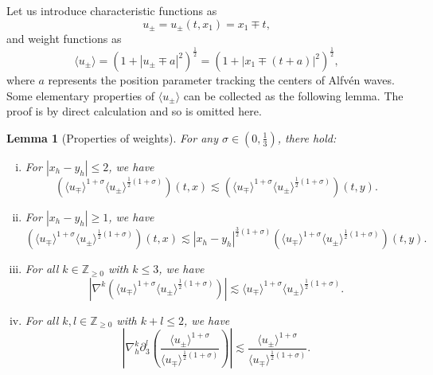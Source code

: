 \documentclass[10pt,reqno]{amsart}
\numberwithin{equation}{section}
\newtheorem{lemma}[theorem]{Lemma}
\begin{document}
Let us introduce characteristic functions as  
\begin{equation}\label{def:u}
u_\pm=u_\pm(t,x_1)=x_1\mp t,
\end{equation}
and  weight functions as 
\begin{equation}\label{def:weight}
\langle u_\pm\rangle=(1+|u_\pm\mp a|^2)^{\frac{1}{2}}=(1+|x_1\mp(t+a)|^2)^{\frac{1}{2}},
\end{equation}
where $a$ represents the position parameter tracking the centers of Alfv\'en waves. Some elementary properties of $\langle u_\pm\rangle$ can be collected as the following lemma. The proof is by direct calculation and so is omitted here. 
 
\begin{lemma}[Properties of weights]\label{lemma:weights}
For any  
 $\sigma\in (0,\frac{1}{3})$, there  hold:
\begin{enumerate}[(i)]
\item For $|x_h-y_h|\leqslant 2$, we have 
\begin{equation}\label{eq:weight1}
	\left(\langle u_\mp\rangle^{1+\sigma}\langle u_\pm\rangle^{\frac{1}{2}(1+\sigma)}\right)(t,x)\lesssim\left(\langle u_\mp\rangle^{1+\sigma}\langle u_\pm\rangle^{\frac{1}{2}(1+\sigma)}\right)(t,y).
\end{equation}
\item For $|x_h-y_h|\geqslant 1$, we have
\begin{equation}\label{eq:weight2}
\left(\langle u_\mp\rangle^{1+\sigma}\langle u_\pm\rangle^{\frac{1}{2}(1+\sigma)}\right)(t,x)\lesssim |x_h-y_h|^{\frac{3}{2}(1+\sigma)}\left(\langle u_\mp\rangle^{1+\sigma}\langle u_\pm\rangle^{\frac{1}{2}(1+\sigma)}\right)(t,y).
\end{equation}
\item For all $k\in\mathbb{Z}_{\geqslant 0}$ with $k\leqslant 3$, we have 
\begin{equation}\label{eq:weight3}
\left|\nabla^k\left(\langle u_\mp\rangle^{1+\sigma}\langle u_\pm\rangle^{\frac{1}{2}(1+\sigma)}\right)\right|\lesssim\langle u_\mp\rangle^{1+\sigma}\langle u_\pm\rangle^{\frac{1}{2}(1+\sigma)}.
\end{equation}
\item For all $k,l\in\mathbb{Z}_{\geqslant 0}$ with $k+l\leqslant 2$, we have 
\begin{equation}\label{eq:weightde}
\left|\nabla_h^k\partial_3^l\left(\frac{\langle u_\pm\rangle^{1+\sigma}}{\langle u_\mp\rangle^{\frac{1}{2}(1+\sigma)}}\right)\right|\lesssim\frac{\langle u_\pm\rangle^{1+\sigma}}{\langle u_\mp\rangle^{\frac{1}{2}(1+\sigma)}}.

\end{equation}
\end{enumerate}
\end{lemma}
\end{document}
